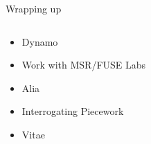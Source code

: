 \documentclass[presentation]{subfiles}
\begin{document}


\begin{frame}{Wrapping up}
\begin{columns}[T]
    \begin{column}{0.5\textwidth}
  \begin{itemize}
  \item[] Dynamo
  \item[] Work with MSR/FUSE Labs
  \item[] Alia
  \item[] Interrogating Piecework
  \item[] Vitae
  \end{itemize}
\end{column}
    \begin{column}{0.5\textwidth}
      
\end{column}
\end{columns}
\end{frame}
\end{document}
